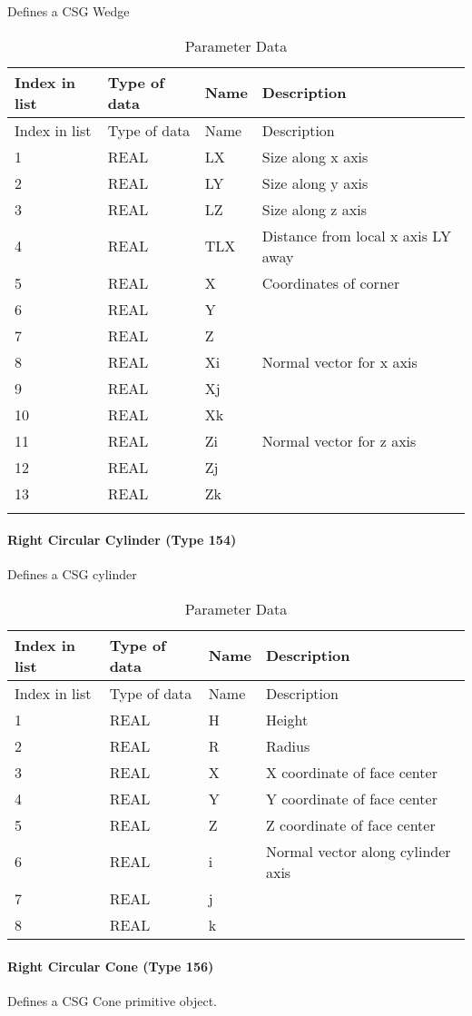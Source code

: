 Defines a CSG Wedge

\begin{longtable}[c]{@{}llll@{}}
\caption{Parameter Data}\tabularnewline
\toprule
Index in list & Type of data & Name & Description\tabularnewline
\midrule
\endfirsthead
\toprule
Index in list & Type of data & Name & Description\tabularnewline
\midrule
\endhead
1 & REAL & LX & Size along x axis\tabularnewline
2 & REAL & LY & Size along y axis\tabularnewline
3 & REAL & LZ & Size along z axis\tabularnewline
4 & REAL & TLX & Distance from local x axis LY away\tabularnewline
5 & REAL & X & Coordinates of corner\tabularnewline
6 & REAL & Y &\tabularnewline
7 & REAL & Z &\tabularnewline
8 & REAL & Xi & Normal vector for x axis\tabularnewline
9 & REAL & Xj &\tabularnewline
10 & REAL & Xk &\tabularnewline
11 & REAL & Zi & Normal vector for z axis\tabularnewline
12 & REAL & Zj &\tabularnewline
13 & REAL & Zk &\tabularnewline
\tabularnewline
\bottomrule
\end{longtable}

\paragraph{Right Circular Cylinder (Type
154)}\label{right-circular-cylinder-type-154}

Defines a CSG cylinder

\begin{longtable}[c]{@{}llll@{}}
\caption{Parameter Data}\tabularnewline
\toprule
Index in list & Type of data & Name & Description\tabularnewline
\midrule
\endfirsthead
\toprule
Index in list & Type of data & Name & Description\tabularnewline
\midrule
\endhead
1 & REAL & H & Height\tabularnewline
2 & REAL & R & Radius\tabularnewline
3 & REAL & X & X coordinate of face center\tabularnewline
4 & REAL & Y & Y coordinate of face center\tabularnewline
5 & REAL & Z & Z coordinate of face center\tabularnewline
6 & REAL & i & Normal vector along cylinder axis\tabularnewline
7 & REAL & j &\tabularnewline
8 & REAL & k &\tabularnewline
\bottomrule
\end{longtable}

\paragraph{Right Circular Cone (Type
156)}\label{right-circular-cone-type-156}

Defines a CSG Cone primitive object.

